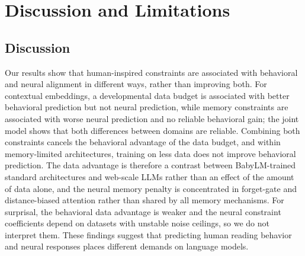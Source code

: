 \section{Discussion and Limitations}
\label{sec:discussion}

\subsection{Discussion}

Our results show that human-inspired constraints are associated with behavioral and neural alignment in different ways, rather than improving both. For contextual embeddings, a developmental data budget is associated with better behavioral prediction but not neural prediction, while memory constraints are associated with worse neural prediction and no reliable behavioral gain; the joint model shows that both differences between domains are reliable. Combining both constraints cancels the behavioral advantage of the data budget, and within memory-limited architectures, training on less data does not improve behavioral prediction. The data advantage is therefore a contrast between BabyLM-trained standard architectures and web-scale LLMs rather than an effect of the amount of data alone, and the neural memory penalty is concentrated in forget-gate and distance-biased attention rather than shared by all memory mechanisms. For surprisal, the behavioral data advantage is weaker and the neural constraint coefficients depend on datasets with unstable noise ceilings, so we do not interpret them. These findings suggest that predicting human reading behavior and neural responses places different demands on language models.

